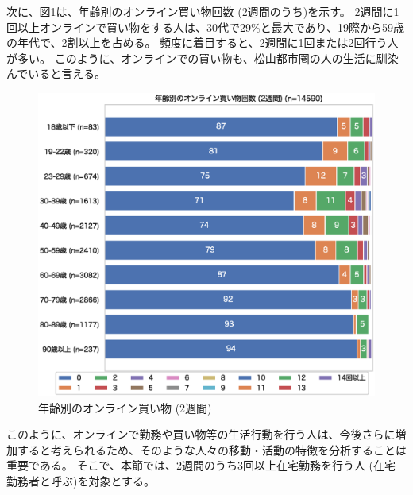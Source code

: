 \documentclass[a4paper,12pt, uplatex]{jsbook}
\begin{document}
次に、図\ref{fig:online_shopping_age}は、年齢別のオンライン買い物回数 (2週間のうち)を示す。
2週間に1回以上オンラインで買い物をする人は、30代で29\%と最大であり、19際から59歳の年代で、2割以上を占める。
頻度に着目すると、2週間に1回または2回行う人が多い。
このように、オンラインでの買い物も、松山都市圏の人の生活に馴染んでいると言える。
%
\begin{figure}[htbp]
    \centering
    \includegraphics[width=1.0\textwidth]{picture/online_shopping_age.eps}
    \caption{年齢別のオンライン買い物 (2週間)}
    \label{fig:online_shopping_age}
\end{figure}

このように、オンラインで勤務や買い物等の生活行動を行う人は、今後さらに増加すると考えられるため、そのような人々の移動・活動の特徴を分析することは重要である。
そこで、本節では、2週間のうち3回以上在宅勤務を行う人 (在宅勤務者と呼ぶ)を対象とする。
\end{document}
